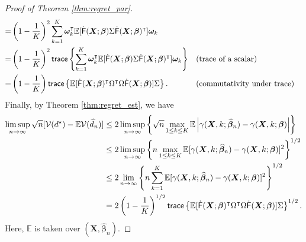 \documentclass[11pt]{article}
\numberwithin{equation}{section}
\theoremstyle{definition}
\theoremstyle{remark}
\newcommand{\bX}{\bm{X}}
\newcommand{\bbeta}{\bm{\beta}}
\newcommand{\bomega}{\bm{\omega}}
\newcommand{\bbE}{\mathbb{E}}
\newcommand{\bbP}{\mathbb{P}}
\newcommand{\cV}{\mathcal{V}}
\newcommand{\sM}{\mathscr{M}}
\newcommand{\sfF}{\mathsf{F}}
\newcommand{\tr}{\mathsf{trace}}	    %
\begin{document}
\begin{proof}[Proof of Theorem \ref{thm:regret_par}]
\begin{align*}
		=& \left( 1 - {1 \over K} \right)^{2}\sum_{k=1}^{K}\bomega_{k}^{\intercal} \bbE[\dot{\sfF}(\bX;\bbeta)\Sigma\dot{\sfF}(\bX;\bbeta)^{\intercal}] \bomega_{k}\\
		=&\left( 1 - {1 \over K} \right)^{2}\tr\left\{  \sum_{k=1}^{K}\bomega_{k}^{\intercal} \bbE[\dot{\sfF}(\bX;\bbeta)\Sigma\dot{\sfF}(\bX;\bbeta)^{\intercal}]\bomega_{k} \right\} &&(\text{trace of a scalar}) \\
		=&\left( 1 - {1 \over K} \right)\tr\left\{ \bbE[\dot{\sfF}(\bX;\bbeta)^{\intercal}\Omega^{\intercal}\Omega \dot{\sfF}(\bX;\bbeta)]\Sigma \right\}. &&(\text{commutativity under trace})
	\end{align*}
	Finally, by Theorem \ref{thm:regret_est}, we have
	\begin{align*}
		\limsup_{n\to\infty}\sqrt{n}[\cV(d^{\star}) - \bbE\cV(\widehat{d}_{n})] &\le 2\limsup_{n\to\infty} \left\{\sqrt{n} \max_{1 \le k \le K}\bbE\left| \gamma(\bX,k;\widehat{\bbeta}_{n}) - \gamma(\bX,k;\bbeta) \right| \right\}\\
		&\le 2\limsup_{n\to\infty}\left\{ n\max_{1 \le k \le K} \bbE[\gamma(\bX,k;\widehat{\bbeta}_{n}) - \gamma(\bX,k;\bbeta)]^{2} \right\}^{1/2} \\
		&\le 2\lim_{n\to\infty}\left\{ n\sum_{k=1}^{K} \bbE[\gamma(\bX,k;\widehat{\bbeta}_{n}) - \gamma(\bX,k;\bbeta)]^{2} \right\}^{1/2}\\
		&= 2\left( 1 - {1 \over K} \right)^{1/2}\tr\left\{ \bbE[\dot{\sfF}(\bX;\bbeta)^{\intercal}\Omega^{\intercal}\Omega \dot{\sfF}(\bX;\bbeta)]\Sigma \right\}^{1/2}.
	\end{align*}
	Here, $ \bbE $ is taken over $ (\bX,\widehat{\bbeta}_{n}) $.
\end{proof}

\end{document}
